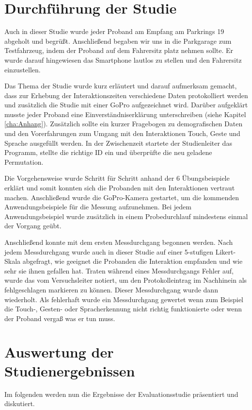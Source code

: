 \section[Durchführung der Studie]{Durchführung der Studie}
Auch in dieser Studie wurde jeder Proband am Empfang am Parkrings 19 abgeholt und begrüßt.
Anschließend begaben wir uns in die Parkgarage zum Testfahrzeug, indem der Proband auf dem Fahrersitz platz nehmen sollte.
Er wurde darauf hingewiesen das Smartphone lautlos zu stellen und den Fahrersitz einzustellen.

Das Thema der Studie wurde kurz erläutert und darauf aufmerksam gemacht, dass zur Erhebung der Interaktionszeiten verschiedene Daten protokolliert werden und zusätzlich die Studie mit einer GoPro aufgezeichnet wird.
Darüber aufgeklärt musste jeder Proband eine Einverständniserklärung unterschreiben (siehe Kapitel \ref{cha:Anhang}).
Zusätzlich sollte ein kurzer Fragebogen zu demografischen Daten und den Vorerfahrungen zum Umgang mit den Interaktionen Touch, Geste und Sprache ausgefüllt werden.
In der Zwischenzeit startete der Studienleiter das Programm, stellte die richtige ID ein und überprüfte die neu geladene Permutation.

Die Vorgehensweise wurde Schritt für Schritt anhand der 6 Übungsbeispiele erklärt und somit konnten sich die Probanden mit den Interaktionen vertraut machen. 
Anschließend wurde die GoPro-Kamera gestartet, um die kommenden Anwendungsbeispiele für die Messung aufzunehmen.
Bei jedem Anwendungsbeispiel wurde zusätzlich in einem Probedurchlauf mindestens einmal der Vorgang geübt. 

Anschließend konnte mit dem ersten Messdurchgang begonnen werden. 
Nach jedem Messdurchgang wurde auch in dieser Studie auf einer 5-stufigen Likert-Skala abgefragt, wie geeignet die Probanden die Interaktion empfanden und wie sehr sie ihnen gefallen hat.
Traten während eines Messdurchgangs Fehler auf, wurde das vom Versuchsleiter notiert, um den Protokolleintrag im Nachhinein als fehlgeschlagen markieren zu können. 
Dieser Messdurchgang wurde dann wiederholt. 
Als fehlerhaft wurde ein Messdurchgang gewertet wenn zum Beispiel die Touch-, Gesten- oder Spracherkennung nicht richtig funktionierte oder wenn der Proband vergaß was er tun muss. 
\clearpage
\section[Auswertung der Studienergebnissen]{Auswertung der Studienergebnissen}
Im folgenden werden nun die Ergebnisse der Evaluationsstudie präsentiert und diskutiert. 


